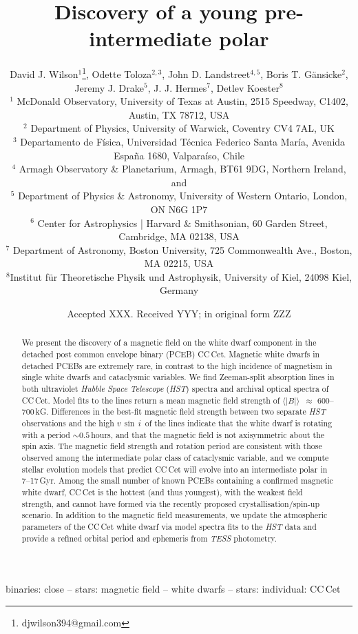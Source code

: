 \documentclass[fleqn,usenatbib]{mnras}
\title[A pre-intermediate polar]{Discovery of a young pre-intermediate polar}
\author[Wilson et al.]{David J. Wilson$^{1}$\thanks{djwilson394@gmail.com}, Odette Toloza$^{2,3}$, John D. Landstreet$^{4,5}$,
Boris T. G{\"a}nsicke$^{2}$, \newauthor Jeremy J.  Drake$^{5}$, J. J. Hermes$^{7}$, Detlev Koester$^{8}$  \medskip\\
$^{1}$ McDonald Observatory, University of Texas at Austin, 2515 Speedway, C1402, Austin, TX 78712, USA \\ 
$^{2}$ Department of Physics, University of Warwick, Coventry CV4 7AL, UK \\
$^{3}$ Departamento de Física, Universidad Técnica Federico Santa María, Avenida España 1680, Valparaíso, Chile\\
$^{4}$ Armagh Observatory \& Planetarium, Armagh, BT61 9DG, Northern Ireland, and  \\
$^{5}$ Department of Physics \& Astronomy, University of Western Ontario, London, ON N6G 1P7 \\
$^{6}$ Center for Astrophysics | Harvard \& Smithsonian, 60 Garden Street, Cambridge, MA 02138, USA\\
$^{7}$ Department of Astronomy, Boston University, 725 Commonwealth Ave., Boston, MA 02215, USA\\
$^{8}$Institut f{\"u}r Theoretische Physik und Astrophysik, University of Kiel, 24098 Kiel, Germany 
}
\date{Accepted XXX. Received YYY; in original form ZZZ}
\newcommand{\bs}{\ensuremath{\langle \vert B \vert \rangle}}
\newcommand{\vsini}{\ensuremath{v\,\sin\,i}}
\begin{document}
\label{firstpage}
\pagerange{\pageref{firstpage}--\pageref{lastpage}}
\maketitle

\begin{abstract}
We present the discovery of a magnetic field on the white dwarf component in the detached post common envelope binary (PCEB) CC\,Cet. Magnetic white dwarfs in detached PCEBs are extremely rare, in contrast to the high incidence of magnetism in single white dwarfs and cataclysmic variables. We find Zeeman-split absorption lines in both ultraviolet \textit{Hubble Space Telescope} (\textit{HST}) spectra and archival optical spectra of CC\,Cet. Model fits to the lines return a mean magnetic field strength of  \bs\ $\approx$ 600--700\,kG. Differences in the best-fit magnetic field strength between two separate \textit{HST} observations and the high \vsini\ of the lines indicate that the white dwarf is  rotating with a period $\sim0.5$\,hours, and that the magnetic field is not axisymmetric about the spin axis. The magnetic field strength and rotation period are consistent with those observed among the intermediate polar class of cataclysmic variable, and we compute stellar evolution models that predict CC\,Cet will evolve into an intermediate polar in 7--17\,Gyr. Among the small number of known PCEBs containing a confirmed magnetic white dwarf, CC\,Cet is the hottest (and thus youngest), with the weakest field strength, and cannot have formed via the recently proposed crystallisation/spin-up scenario. In addition to the magnetic field measurements, we update the atmospheric parameters of the CC\,Cet white dwarf via model spectra fits to the \textit{HST} data and provide a refined orbital period and ephemeris from \textit{TESS} photometry.       
\end{abstract}

\begin{keywords}
binaries: close -- stars: magnetic field -- white dwarfs -- stars: individual: CC\,Cet
\end{keywords}


\end{document}
